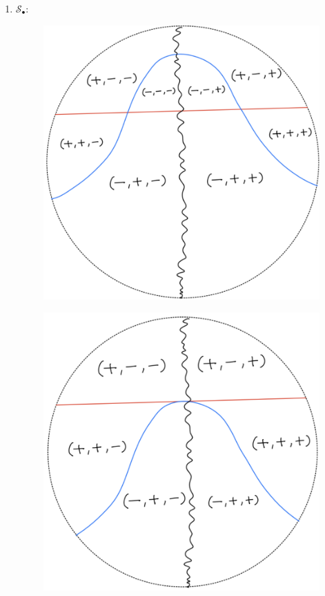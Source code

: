 \begin{definition}
\begin{enumerate}
\item $\mathcal{S}_\bullet$:
\begin{itemize}
\begin{figure}[H]
    \centering
    \includegraphics[scale = 0.45]{diagrams/lemma3/7.png} 
    \caption{}
    \label{fig:your-label}
\end{figure}
\begin{figure}[H]
    \centering
    \includegraphics[scale = 0.45]{diagrams/lemma3/8.png} 

\end{figure}
\end{itemize}
\end{enumerate}
\end{definition}
